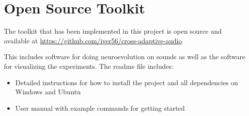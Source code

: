 
\chapter{Open Source Toolkit}
\label{appendix:toolkit}
The toolkit that has been implemented in this project is open source and available at \hfill \break
\url{https://github.com/iver56/cross-adaptive-audio}

This includes software for doing neuroevolution on sounds as well as the software for visualizing the experiments. The readme file includes:

\begin{itemize}
\item Detailed instructions for how to install the project and all dependencies on Windows and Ubuntu
\item User manual with example commands for getting started
\end{itemize}
